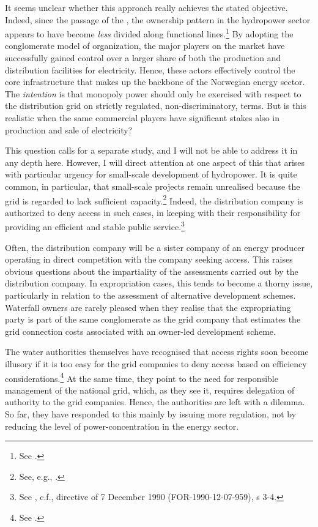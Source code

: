 It seems unclear whether this approach really achieves the stated objective. Indeed, since the passage of the \cite{ea90}, the ownership pattern in the hydropower sector appears to have become {\it less} divided along functional lines.\footnote{See \cite{bibow11}.} By adopting the conglomerate model of organization, the major players on the market have successfully gained control over a larger share of both the production and distribution facilities for electricity. Hence, these actors effectively control the core infrastructure that makes up the backbone of the Norwegian energy sector. The {\it intention} is that monopoly power should only be exercised with respect to the distribution grid on strictly regulated, non-discriminatory, terms. But is this realistic when the same commercial players have significant stakes also in production and sale of electricity?

This question calls for a separate study, and I will not be able to address it in any depth here. However, I will direct attention at one aspect of this that arises with particular urgency for small-scale development of hydropower. It is quite common, in particular, that small-scale projects remain unrealised because the grid is regarded to lack sufficient capacity.\footnote{See, e.g., \cite[84,161-162]{nou129}.} Indeed, the distribution company is authorized to deny access in such cases, in keeping with their responsibility for providing an efficient and stable public service.\footnote{See \cite[3-4]{ea90}, c.f., directive of 7 December 1990 (FOR-1990-12-07-959), s 3-4.}

Often, the distribution company will be a sister company of an energy producer operating in direct competition with the company seeking access. This raises obvious questions about the impartiality of the assessments carried out by the distribution company. In expropriation cases, this tends to become a thorny issue, particularly in relation to the assessment of alternative development schemes. Waterfall owners are rarely pleased when they realise that the expropriating party is part of the same conglomerate as the grid company that estimates the grid connection costs associated with an owner-led development scheme. 

The water authorities themselves have recognised that access rights soon become illusory if it is too easy for the grid companies to deny access based on efficiency considerations.\footnote{See \cite{otprp62}.} At the same time, they point to the need for responsible management of the national grid, which, as they see it, requires delegation of authority to the grid companies. Hence, the authorities are left with a dilemma. So far, they have responded to this mainly by issuing more regulation, not by reducing the level of power-concentration in the energy sector.

